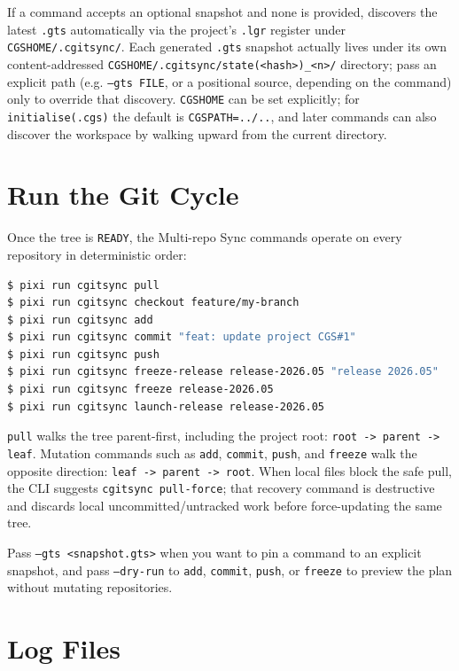 If a command accepts an optional snapshot and none is provided, \cgscli{}
discovers the latest \texttt{.gts} automatically via the project's
\texttt{.lgr} register under \texttt{CGSHOME/.cgitsync/}. Each generated
\texttt{.gts} snapshot actually lives under its own content-addressed
\texttt{CGSHOME/.cgitsync/state(<hash>)\_<n>/} directory; pass an explicit
path (e.g. \texttt{--gts FILE}, or a positional source, depending on the
command) only to override that discovery.
\texttt{CGSHOME} can be set explicitly; for \texttt{initialise(.cgs)} the
default is \texttt{CGSPATH=../..}, and later commands can also discover the
workspace by walking upward from the current directory.

\section{Run the Git Cycle}

Once the tree is \texttt{READY}, the Multi-repo Sync commands operate on every
repository in deterministic order:

\begin{lstlisting}[language=bash]
$ pixi run cgitsync pull
$ pixi run cgitsync checkout feature/my-branch
$ pixi run cgitsync add
$ pixi run cgitsync commit "feat: update project CGS#1"
$ pixi run cgitsync push
$ pixi run cgitsync freeze-release release-2026.05 "release 2026.05"
$ pixi run cgitsync freeze release-2026.05
$ pixi run cgitsync launch-release release-2026.05
\end{lstlisting}

\texttt{pull} walks the tree parent-first, including the project root:
\texttt{root -> parent -> leaf}.  Mutation commands such as \texttt{add},
\texttt{commit}, \texttt{push}, and \texttt{freeze} walk the opposite direction:
\texttt{leaf -> parent -> root}.
When local files block the safe pull, the CLI suggests
\texttt{cgitsync pull-force}; that recovery command is destructive and discards
local uncommitted/untracked work before force-updating the same tree.

Pass \texttt{--gts <snapshot.gts>} when you want to pin a command to an
explicit snapshot, and pass \texttt{--dry-run} to \texttt{add},
\texttt{commit}, \texttt{push}, or \texttt{freeze} to preview
the plan without mutating repositories.

\section{Log Files}

